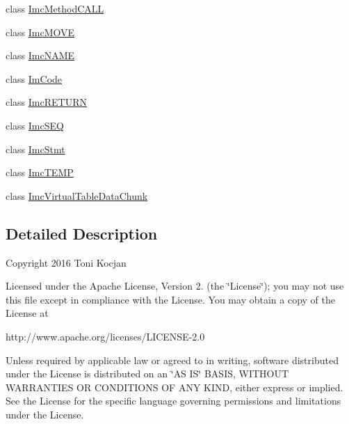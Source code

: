 \begin{DoxyCompactItemize}
\item 
class \hyperlink{classcompiler_1_1imcode_1_1_imc_method_c_a_l_l}{Imc\+Method\+C\+A\+LL}
\item 
class \hyperlink{classcompiler_1_1imcode_1_1_imc_m_o_v_e}{Imc\+M\+O\+VE}
\item 
class \hyperlink{classcompiler_1_1imcode_1_1_imc_n_a_m_e}{Imc\+N\+A\+ME}
\item 
class \hyperlink{classcompiler_1_1imcode_1_1_im_code}{Im\+Code}
\item 
class \hyperlink{classcompiler_1_1imcode_1_1_imc_r_e_t_u_r_n}{Imc\+R\+E\+T\+U\+RN}
\item 
class \hyperlink{classcompiler_1_1imcode_1_1_imc_s_e_q}{Imc\+S\+EQ}
\item 
class \hyperlink{classcompiler_1_1imcode_1_1_imc_stmt}{Imc\+Stmt}
\item 
class \hyperlink{classcompiler_1_1imcode_1_1_imc_t_e_m_p}{Imc\+T\+E\+MP}
\item 
class \hyperlink{classcompiler_1_1imcode_1_1_imc_virtual_table_data_chunk}{Imc\+Virtual\+Table\+Data\+Chunk}
\end{DoxyCompactItemize}


\subsection{Detailed Description}
Copyright 2016 Toni Kocjan

Licensed under the Apache License, Version 2. (the \char`\"{}\+License\char`\"{}); you may not use this file except in compliance with the License. You may obtain a copy of the License at \begin{DoxyVerb}http://www.apache.org/licenses/LICENSE-2.0
\end{DoxyVerb}


Unless required by applicable law or agreed to in writing, software distributed under the License is distributed on an \char`\"{}\+A\+S I\+S\char`\"{} B\+A\+S\+IS, W\+I\+T\+H\+O\+UT W\+A\+R\+R\+A\+N\+T\+I\+ES OR C\+O\+N\+D\+I\+T\+I\+O\+NS OF A\+NY K\+I\+ND, either express or implied. See the License for the specific language governing permissions and limitations under the License. 